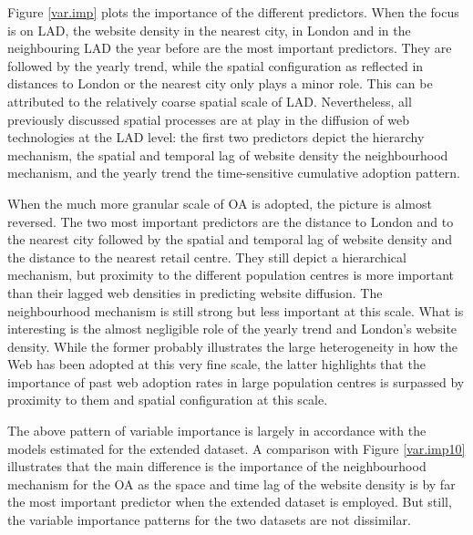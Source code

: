 \documentclass[
  authoryear,
  preprint,
  3p]{elsarticle}
\begin{document}
Figure \ref{var.imp} plots the importance of the different predictors.
When the focus is on LAD, the website density in the nearest city, in
London and in the neighbouring LAD the year before are the most
important predictors. They are followed by the yearly trend, while the
spatial configuration as reflected in distances to London or the nearest
city only plays a minor role. This can be attributed to the relatively
coarse spatial scale of LAD. Nevertheless, all previously discussed
spatial processes are at play in the diffusion of web technologies at
the LAD level: the first two predictors depict the hierarchy mechanism,
the spatial and temporal lag of website density the neighbourhood
mechanism, and the yearly trend the time-sensitive cumulative adoption
pattern.

When the much more granular scale of OA is adopted, the picture is
almost reversed. The two most important predictors are the distance to
London and to the nearest city followed by the spatial and temporal lag
of website density and the distance to the nearest retail centre. They
still depict a hierarchical mechanism, but proximity to the different
population centres is more important than their lagged web densities in
predicting website diffusion. The neighbourhood mechanism is still
strong but less important at this scale. What is interesting is the
almost negligible role of the yearly trend and London's website density.
While the former probably illustrates the large heterogeneity in how the
Web has been adopted at this very fine scale, the latter highlights that
the importance of past web adoption rates in large population centres is
surpassed by proximity to them and spatial configuration at this scale.

The above pattern of variable importance is largely in accordance with
the models estimated for the extended dataset. A comparison with Figure
\ref{var.imp10} illustrates that the main difference is the importance
of the neighbourhood mechanism for the OA as the space and time lag of
the website density is by far the most important predictor when the
extended dataset is employed. But still, the variable importance
patterns for the two datasets are not dissimilar.
\end{document}
